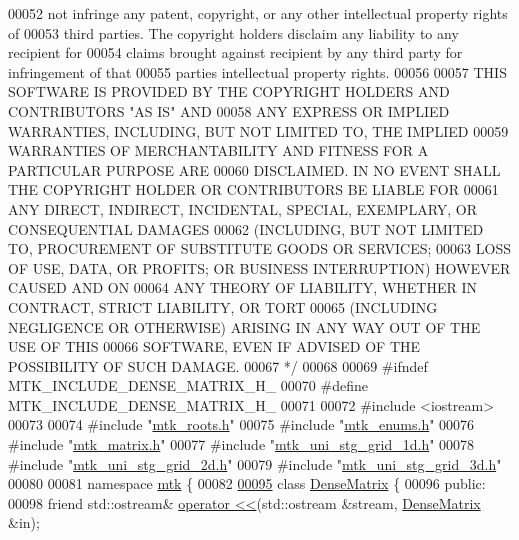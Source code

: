 \begin{DoxyCode}
00052 \textcolor{comment}{not infringe any patent, copyright, or any other intellectual property rights of}
00053 \textcolor{comment}{third parties. The copyright holders disclaim any liability to any recipient for}
00054 \textcolor{comment}{claims brought against recipient by any third party for infringement of that}
00055 \textcolor{comment}{parties intellectual property rights.}
00056 \textcolor{comment}{}
00057 \textcolor{comment}{THIS SOFTWARE IS PROVIDED BY THE COPYRIGHT HOLDERS AND CONTRIBUTORS "AS IS" AND}
00058 \textcolor{comment}{ANY EXPRESS OR IMPLIED WARRANTIES, INCLUDING, BUT NOT LIMITED TO, THE IMPLIED}
00059 \textcolor{comment}{WARRANTIES OF MERCHANTABILITY AND FITNESS FOR A PARTICULAR PURPOSE ARE}
00060 \textcolor{comment}{DISCLAIMED. IN NO EVENT SHALL THE COPYRIGHT HOLDER OR CONTRIBUTORS BE LIABLE FOR}
00061 \textcolor{comment}{ANY DIRECT, INDIRECT, INCIDENTAL, SPECIAL, EXEMPLARY, OR CONSEQUENTIAL DAMAGES}
00062 \textcolor{comment}{(INCLUDING, BUT NOT LIMITED TO, PROCUREMENT OF SUBSTITUTE GOODS OR SERVICES;}
00063 \textcolor{comment}{LOSS OF USE, DATA, OR PROFITS; OR BUSINESS INTERRUPTION) HOWEVER CAUSED AND ON}
00064 \textcolor{comment}{ANY THEORY OF LIABILITY, WHETHER IN CONTRACT, STRICT LIABILITY, OR TORT}
00065 \textcolor{comment}{(INCLUDING NEGLIGENCE OR OTHERWISE) ARISING IN ANY WAY OUT OF THE USE OF THIS}
00066 \textcolor{comment}{SOFTWARE, EVEN IF ADVISED OF THE POSSIBILITY OF SUCH DAMAGE.}
00067 \textcolor{comment}{*/}
00068 
00069 \textcolor{preprocessor}{#ifndef MTK\_INCLUDE\_DENSE\_MATRIX\_H\_}
00070 \textcolor{preprocessor}{#define MTK\_INCLUDE\_DENSE\_MATRIX\_H\_}
00071 
00072 \textcolor{preprocessor}{#include <iostream>}
00073 
00074 \textcolor{preprocessor}{#include "\hyperlink{mtk__roots_8h}{mtk\_roots.h}"}
00075 \textcolor{preprocessor}{#include "\hyperlink{mtk__enums_8h}{mtk\_enums.h}"}
00076 \textcolor{preprocessor}{#include "\hyperlink{mtk__matrix_8h}{mtk\_matrix.h}"}
00077 \textcolor{preprocessor}{#include "\hyperlink{mtk__uni__stg__grid__1d_8h}{mtk\_uni\_stg\_grid\_1d.h}"}
00078 \textcolor{preprocessor}{#include "\hyperlink{mtk__uni__stg__grid__2d_8h}{mtk\_uni\_stg\_grid\_2d.h}"}
00079 \textcolor{preprocessor}{#include "\hyperlink{mtk__uni__stg__grid__3d_8h}{mtk\_uni\_stg\_grid\_3d.h}"}
00080 
00081 \textcolor{keyword}{namespace }\hyperlink{namespacemtk}{mtk} \{
00082 
\hypertarget{mtk__dense__matrix_8h_source_l00095}{}\hyperlink{classmtk_1_1DenseMatrix}{00095} \textcolor{keyword}{class }\hyperlink{classmtk_1_1DenseMatrix}{DenseMatrix} \{
00096  \textcolor{keyword}{public}:
00098   \textcolor{keyword}{friend} std::ostream& \hyperlink{classmtk_1_1DenseMatrix_adbcc850ef373550f634f563573a31d28}{operator <<}(std::ostream &stream, \hyperlink{classmtk_1_1DenseMatrix}{DenseMatrix} &in);

\end{DoxyCode}
